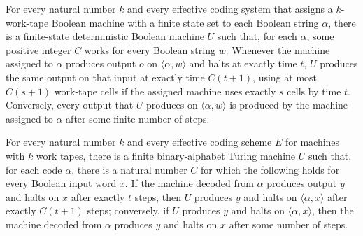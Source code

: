 \begin{theorem}
\label{Turing.exists_selfUniversalK}
\leanok
{}
For every natural number $k$ and every effective coding system that assigns a
$k$-work-tape Boolean machine with a finite state set to each Boolean string $\alpha$,
there is a finite-state deterministic Boolean machine $U$ such that, for each $\alpha$,
some positive integer $C$ works for every Boolean string $w$. Whenever the machine
assigned to $\alpha$ produces output $o$ on $\langle\alpha,w\rangle$ and halts at
exactly time $t$, $U$ produces the same output on that input at exactly time $C(t+1)$,
using at most $C(s+1)$ work-tape cells if the assigned machine uses exactly $s$ cells by
time $t$. Conversely, every output that $U$ produces on $\langle\alpha,w\rangle$ is
produced by the machine assigned to $\alpha$ after some finite number of steps.
\end{theorem}

\begin{theorem}
\label{Turing.universalK}
\leanok
{}
For every natural number $k$ and every effective coding scheme $E$ for machines with $k$
work tapes, there is a finite binary-alphabet Turing machine $U$ such that, for each
code $\alpha$, there is a natural number $C$ for which the following holds for every
Boolean input word $x$. If the machine decoded from $\alpha$ produces output $y$ and
halts on $x$ after exactly $t$ steps, then $U$ produces $y$ and halts on
$\langle\alpha,x\rangle$ after exactly $C(t+1)$ steps; conversely, if $U$ produces $y$
and halts on $\langle\alpha,x\rangle$, then the machine decoded from $\alpha$ produces
$y$ and halts on $x$ after some number of steps.
\end{theorem}
